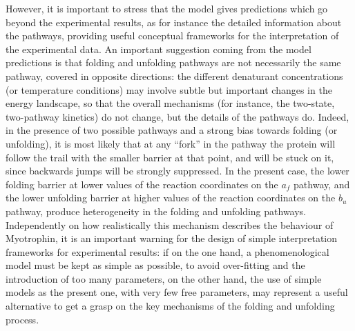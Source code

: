 However, it is important to stress that the model gives predictions which go
beyond the experimental results, as for instance the detailed information about
the pathways, providing useful conceptual frameworks for the interpretation of
the experimental data. %
An important suggestion coming from the model predictions is that folding and
unfolding pathways are not necessarily the same pathway, covered in opposite
directions: the different denaturant concentrations (or temperature conditions)
may involve subtle but important changes in the energy landscape, so that the
overall mechanisms (for instance, the two-state, two-pathway kinetics)  do not
change, but the details of the pathways do. Indeed, in the presence of two
possible pathways and a strong bias towards folding (or unfolding), it is most
likely that at any ``fork'' in the pathway the protein will follow the trail
with the smaller barrier at that point, and will be stuck on it, since backwards
jumps will be strongly suppressed. In the present case, the lower folding
barrier at lower values of the reaction coordinates on the $a_f$ pathway, and
the lower unfolding barrier at higher values of the reaction coordinates on the
$b_u$ pathway, produce heterogeneity in the folding and unfolding pathways.
Independently on how realistically this mechanism describes the behaviour of
Myotrophin, it 
is an important warning for the design of simple interpretation frameworks for
experimental results: if on the one hand, a phenomenological model must be kept
as  simple as  possible, to avoid over-fitting and the introduction of too many
parameters, on the other hand, the use of simple models as the present one, with
very few free parameters, may represent a useful alternative to get a grasp on
the key mechanisms of the folding and unfolding process.



